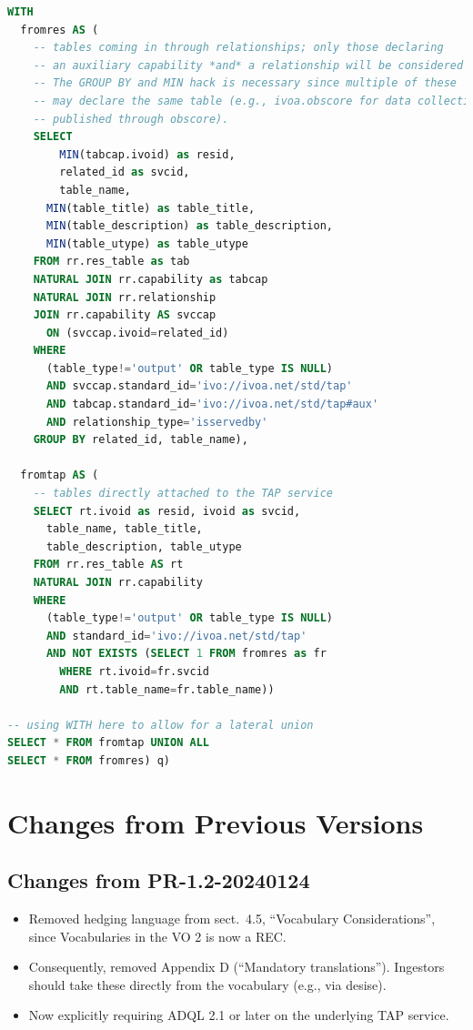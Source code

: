 \documentclass[11pt,a4paper]{ivoa}
\begin{document}
\begin{lstlisting}[basicstyle=\footnotesize,language=SQL]
WITH
  fromres AS (
    -- tables coming in through relationships; only those declaring
    -- an auxiliary capability *and* a relationship will be considered
    -- The GROUP BY and MIN hack is necessary since multiple of these
    -- may declare the same table (e.g., ivoa.obscore for data collections
    -- published through obscore).
    SELECT
    	MIN(tabcap.ivoid) as resid,
    	related_id as svcid,
    	table_name,
      MIN(table_title) as table_title,
      MIN(table_description) as table_description,
      MIN(table_utype) as table_utype
    FROM rr.res_table as tab
    NATURAL JOIN rr.capability as tabcap
    NATURAL JOIN rr.relationship
    JOIN rr.capability AS svccap
      ON (svccap.ivoid=related_id)
    WHERE
      (table_type!='output' OR table_type IS NULL)
      AND svccap.standard_id='ivo://ivoa.net/std/tap'
      AND tabcap.standard_id='ivo://ivoa.net/std/tap#aux'
      AND relationship_type='isservedby'
    GROUP BY related_id, table_name),

  fromtap AS (
    -- tables directly attached to the TAP service
    SELECT rt.ivoid as resid, ivoid as svcid,
      table_name, table_title,
      table_description, table_utype
    FROM rr.res_table AS rt
    NATURAL JOIN rr.capability
    WHERE
      (table_type!='output' OR table_type IS NULL)
      AND standard_id='ivo://ivoa.net/std/tap'
      AND NOT EXISTS (SELECT 1 FROM fromres as fr
        WHERE rt.ivoid=fr.svcid
        AND rt.table_name=fr.table_name))

-- using WITH here to allow for a lateral union
SELECT * FROM fromtap UNION ALL
SELECT * FROM fromres) q)
\end{lstlisting}


\section{Changes from Previous Versions}

\subsection{Changes from PR-1.2-20240124}

\begin{itemize}
\item Removed hedging language from sect.~4.5, ``Vocabulary
Considerations'', since Vocabularies in the VO 2 is now a REC.

\item Consequently, removed Appendix D (``Mandatory translations'').
Ingestors should take these directly from the vocabulary (e.g., via
desise).

\item Now explicitly requiring ADQL 2.1 or later on the underlying TAP
service.
\end{itemize}
\end{document}
